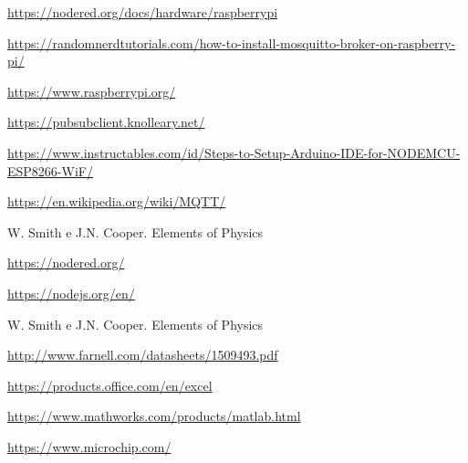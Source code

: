 \documentclass[12pt]{article}
\begin{document}
\begin{thebibliography}{50}
\url{https://nodered.org/docs/hardware/raspberrypi}

\url{https://randomnerdtutorials.com/how-to-install-mosquitto-broker-on-raspberry-pi/}

\url{https://www.raspberrypi.org/}

\url{https://pubsubclient.knolleary.net/ }

\url{https://www.instructables.com/id/Steps-to-Setup-Arduino-IDE-for-NODEMCU-ESP8266-WiF/}

\url{https://en.wikipedia.org/wiki/MQTT/}

W. Smith e J.N. Cooper. Elements of
Physics

\url{https://nodered.org/}

\url{https://nodejs.org/en/}

W. Smith e J.N. Cooper. Elements of
Physics

\url{http://www.farnell.com/datasheets/1509493.pdf}

\url{https://products.office.com/en/excel}

\url{https://www.mathworks.com/products/matlab.html}

\url{https://www.microchip.com/}



\end{thebibliography}
\end{document}
